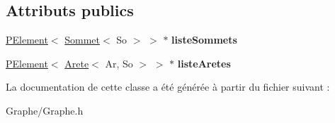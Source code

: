 \subsection*{Attributs publics}
\begin{DoxyCompactItemize}
\item 
\mbox{\label{class_graphe_a51045d1042f9e9bdf2b798e324abbaaa}} 
\mbox{\hyperlink{class_p_element}{P\+Element}}$<$ \mbox{\hyperlink{class_sommet}{Sommet}}$<$ So $>$ $>$ $\ast$ {\bfseries liste\+Sommets}
\item 
\mbox{\label{class_graphe_a270afe24473b6531a7da7cc524ee20e2}} 
\mbox{\hyperlink{class_p_element}{P\+Element}}$<$ \mbox{\hyperlink{class_arete}{Arete}}$<$ Ar, So $>$ $>$ $\ast$ {\bfseries liste\+Aretes}
\end{DoxyCompactItemize}


La documentation de cette classe a été générée à partir du fichier suivant \+:\begin{DoxyCompactItemize}
\item 
Graphe/Graphe.\+h\end{DoxyCompactItemize}
